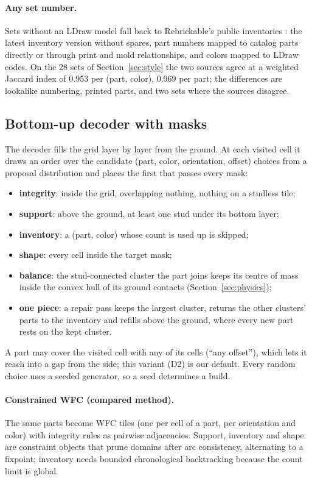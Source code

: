 \documentclass[10pt,twocolumn]{article}
\begin{document}
\paragraph{Any set number.} Sets without an LDraw model fall back to Rebrickable's public inventories
\cite{rebrickable}: the latest inventory version without spares, part numbers mapped to catalog parts directly or
through print and mold relationships, and colors mapped to LDraw codes. On the 28 sets of Section~\ref{sec:style}
the two sources agree at a weighted Jaccard index of 0.953 per (part, color), 0.969 per part; the differences are
lookalike numbering, printed parts, and two sets where the sources disagree.

\subsection{Bottom-up decoder with masks}
The decoder fills the grid layer by layer from the ground. At each visited cell it draws an order over the candidate
(part, color, orientation, offset) choices from a proposal distribution and places the first that passes every mask:
\begin{itemize}
  \item \textbf{integrity}: inside the grid, overlapping nothing, nothing on a studless tile;
  \item \textbf{support}: above the ground, at least one stud under its bottom layer;
  \item \textbf{inventory}: a (part, color) whose count is used up is skipped;
  \item \textbf{shape}: every cell inside the target mask;
  \item \textbf{balance}: the stud-connected cluster the part joins keeps its centre of mass inside the convex
    hull of its ground contacts (Section~\ref{sec:physics});
  \item \textbf{one piece}: a repair pass keeps the largest cluster, returns the other clusters' parts to the
    inventory and refills above the ground, where every new part rests on the kept cluster.
\end{itemize}
A part may cover the visited cell with any of its cells (``any offset''), which lets it reach into a gap from the
side; this variant (D2) is our default. Every random choice uses a seeded generator, so a seed determines a build.

\paragraph{Constrained WFC (compared method).} The same parts become WFC tiles (one per cell of a part, per
orientation and color) with integrity rules as pairwise adjacencies. Support, inventory and shape are constraint
objects that prune domains after arc consistency, alternating to a fixpoint; inventory needs bounded chronological
backtracking because the count limit is global.
\end{document}
